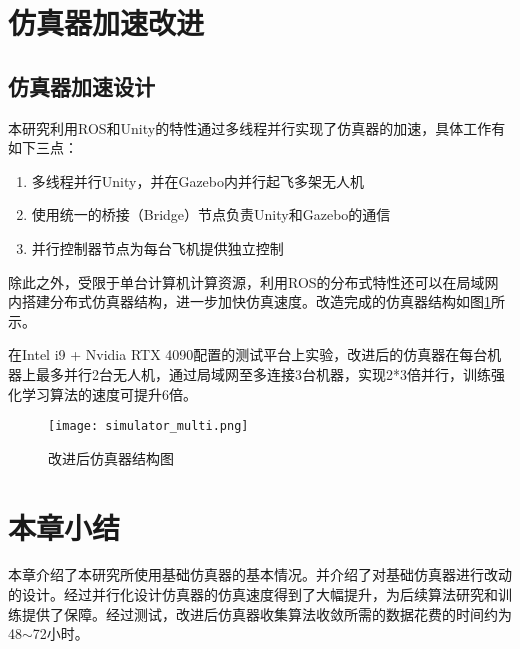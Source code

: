 \section{仿真器加速改进}
\subsection{仿真器加速设计}
本研究利用ROS和Unity的特性通过多线程并行实现了仿真器的加速，具体工作有如下三点：
\begin{enumerate}
  \item 多线程并行Unity，并在Gazebo内并行起飞多架无人机
  \item 使用统一的桥接（Bridge）节点负责Unity和Gazebo的通信
  \item 并行控制器节点为每台飞机提供独立控制
\end{enumerate}

除此之外，受限于单台计算机计算资源，利用ROS的分布式特性还可以在局域网内搭建分布式仿真器结构，进一步加快仿真速度。改造完成的仿真器结构如图\ref{fig_simulator_multi}所示。

在Intel i9 + Nvidia RTX 4090配置的测试平台上实验，改进后的仿真器在每台机器上最多并行2台无人机，通过局域网至多连接3台机器，实现2*3倍并行，训练强化学习算法的速度可提升6倍。
\begin{figure}
  \centering
  \texttt{[image: simulator\_multi.png]}
  \caption{改进后仿真器结构图}
  \label{fig_simulator_multi}
\end{figure}

\section{本章小结}

本章介绍了本研究所使用基础仿真器的基本情况。并介绍了对基础仿真器进行改动的设计。经过并行化设计仿真器的仿真速度得到了大幅提升，为后续算法研究和训练提供了保障。经过测试，改进后仿真器收集算法收敛所需的数据花费的时间约为48$\sim$72小时。





